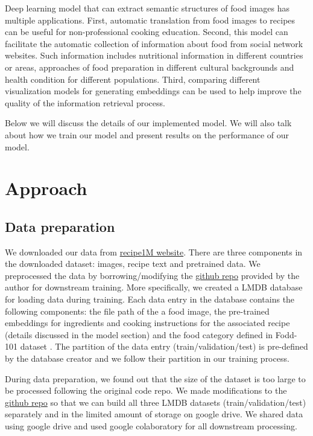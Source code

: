 \documentclass[10pt,twocolumn,letterpaper]{article}
\begin{document}
Deep learning model that can extract semantic structures of food images has multiple applications.  First, automatic translation from food images to recipes can be useful for non-professional cooking education.  Second, this model can facilitate the automatic collection of information about food from social network websites.  Such information includes nutritional information in different countries or areas, approaches of food preparation in different cultural backgrounds and health condition for different populations.  Third, comparing different visualization models for generating embeddings can be used to help improve the quality of the information retrieval process.

Below we will discuss the details of our implemented model.  We will also talk about how we train our model and present results on the performance of our model.

\section{Approach}

\subsection{Data preparation}
We downloaded our data from \href{http://im2recipe.csail.mit.edu/dataset/download/}{recipe1M website}.  There are three components in the downloaded dataset: images, recipe text and pretrained data.  We preprocessed the data by borrowing/modifying the \href{https://github.com/torralba-lab/im2recipe-Pytorch}{github repo} provided by the author for downstream training.  More specifically, we created a LMDB database for loading data during training.  Each data entry in the database contains the following components: the file path of the a food image, the pre-trained embeddings for ingredients and cooking instructions for the associated recipe (details discussed in the model section) and the food category defined in Fodd-101 dataset \cite{bossard14}.  The partition of the data entry (train/validation/test) is pre-defined by the database creator and we follow their partition in our training process.

During data preparation, we found out that the size of the dataset is too large to be processed following the original code repo.  We made modifications to the \href{https://github.com/torralba-lab/im2recipe-Pytorch}{github repo} so that we can build all three LMDB datasets (train/validation/test) separately and in the limited amount of storage on google drive.  We shared data using google drive and used google colaboratory for all downstream processing.
\end{document}
